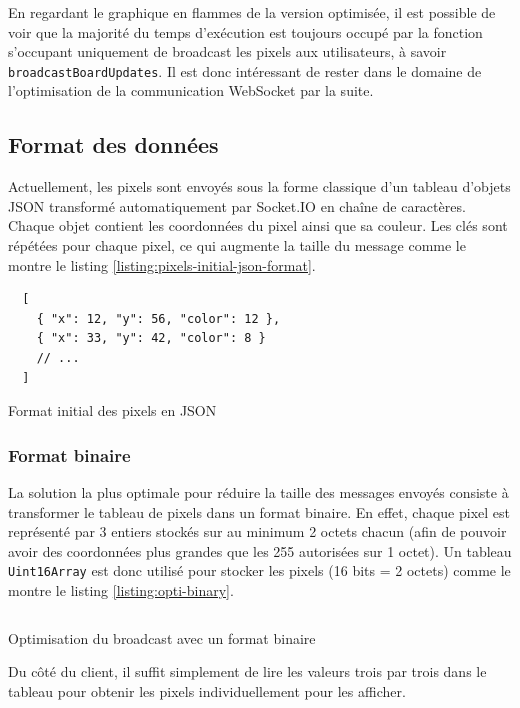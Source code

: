 En regardant le graphique en flammes de la version optimisée, il est possible de voir que la majorité du temps d'exécution est toujours occupé par la fonction s'occupant uniquement de broadcast les pixels aux utilisateurs, à savoir \texttt{broadcastBoardUpdates}. Il est donc intéressant de rester dans le domaine de l'optimisation de la communication WebSocket par la suite.

\subsection{Format des données}

Actuellement, les pixels sont envoyés sous la forme classique d'un tableau d'objets JSON transformé automatiquement par Socket.IO en chaîne de caractères. Chaque objet contient les coordonnées du pixel ainsi que sa couleur. Les clés sont répétées pour chaque pixel, ce qui augmente la taille du message comme le montre le listing \ref{listing:pixels-initial-json-format}.

\begin{listing}[H]
  \begin{verbatim}
  [
    { "x": 12, "y": 56, "color": 12 },
    { "x": 33, "y": 42, "color": 8 }
    // ...
  ]
\end{verbatim}
  \caption{Format initial des pixels en JSON}
  \label{listing:pixels-initial-json-format}
\end{listing}

\subsubsection{Format binaire}

La solution la plus optimale pour réduire la taille des messages envoyés consiste à transformer le tableau de pixels dans un format binaire. En effet, chaque pixel est représenté par 3 entiers stockés sur au minimum 2 octets chacun (afin de pouvoir avoir des coordonnées plus grandes que les 255 autorisées sur 1 octet). Un tableau \texttt{Uint16Array} est donc utilisé pour stocker les pixels (16 bits = 2 octets) comme le montre le listing \ref{listing:opti-binary}.

\begin{listing}[H]
  \inputminted[highlightlines={9}, linenos]{ts}{assets/figures/opti-binary.ts}
  \caption{Optimisation du broadcast avec un format binaire}
  \label{listing:opti-binary}
\end{listing}

Du côté du client, il suffit simplement de lire les valeurs trois par trois dans le tableau pour obtenir les pixels individuellement pour les afficher.

